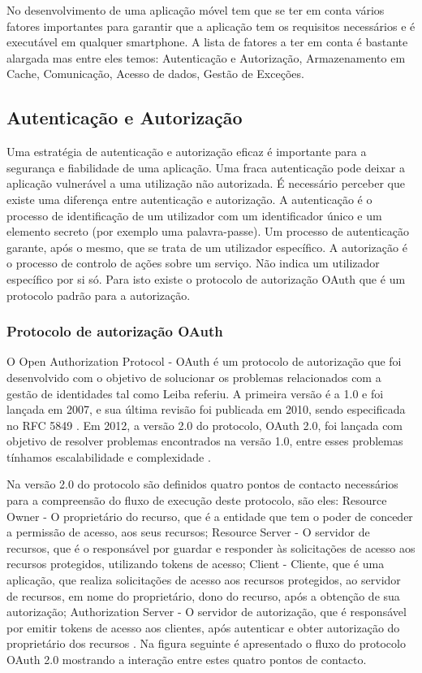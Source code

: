 No desenvolvimento de uma aplicação móvel tem que se ter em conta vários fatores importantes para garantir que a aplicação tem os requisitos necessários e é executável em qualquer smartphone. A lista de fatores a ter em conta é bastante alargada mas entre eles temos: Autenticação e Autorização, Armazenamento em Cache, Comunicação, Acesso de dados, Gestão de Exceções. \cite{mobileappbook}

\subsection{Autenticação e Autorização}

Uma estratégia de autenticação e autorização eficaz é importante para a segurança e fiabilidade de uma aplicação. Uma fraca autenticação pode deixar a aplicação vulnerável a uma utilização não autorizada. É necessário perceber que existe uma diferença entre autenticação e autorização. A autenticação é o processo de identificação de um utilizador com um identificador único e um elemento secreto (por exemplo uma palavra-passe). Um processo de autenticação garante, após o mesmo, que se trata de um utilizador específico. A autorização é o processo de controlo de ações sobre um serviço. Não indica um utilizador específico por si só. Para isto existe o protocolo de autorização OAuth que é um protocolo padrão para a autorização.\cite{oauth20}

\subsubsection{Protocolo de autorização OAuth}
O Open Authorization Protocol - OAuth é um protocolo de autorização que foi desenvolvido com o objetivo de solucionar os problemas relacionados com a gestão de identidades tal como Leiba \cite{leiba_oauth} referiu.
 A primeira versão é a 1.0 e foi lançada em 2007, e sua última revisão foi publicada em 2010, sendo especificada no \gls{RFC} 5849 \cite{oauth10}. Em 2012, a versão 2.0 do protocolo, OAuth 2.0, foi lançada com objetivo de resolver problemas encontrados
na versão 1.0, entre esses problemas tínhamos escalabilidade e complexidade \cite{oauth20}.
\par
Na versão 2.0 do protocolo são definidos quatro pontos de contacto necessários para a compreensão do fluxo de execução deste protocolo, são eles: Resource Owner - O proprietário do recurso, que é a entidade que tem o poder de conceder a permissão de acesso, aos seus recursos; Resource Server - O servidor de recursos, que é o responsável por guardar e responder às solicitações de acesso aos recursos protegidos, utilizando tokens de acesso; Client - Cliente, que é uma aplicação, que realiza solicitações de acesso aos recursos protegidos, ao servidor de recursos, em nome do proprietário, dono do recurso, após a obtenção de sua autorização; Authorization Server - O servidor de autorização, que é responsável por emitir tokens de acesso aos clientes, após autenticar e obter autorização do proprietário dos recursos \cite{oauth20}. Na figura seguinte é apresentado o fluxo do protocolo OAuth 2.0 mostrando a interação entre estes quatro pontos de contacto.

